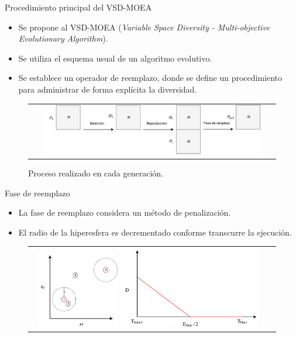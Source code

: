\documentclass{beamer}
\begin{document}
\begin{frame}{Procedimiento principal del VSD-MOEA}
\begin{itemize}
\justifying
\item Se propone al VSD-MOEA (\textit{Variable Space Diversity - Multi-objective Evolutionary Algorithm}).
\justifying
\item Se utiliza el esquema usual de un algoritmo evolutivo.
\justifying
\item Se establece un operador de reemplazo, donde se define un procedimiento para administrar de forma explícita la diversidad.
\end{itemize}
\begin{figure}
\centering
\begin{tabular}{c}
\includegraphics[width=0.9\textwidth]{Evolution_Process.pdf}
\end{tabular}
\caption{Proceso realizado en cada generación.}
\label{fig:DiversityProposal}
\end{figure}
\end{frame}


\begin{frame}{Fase de reemplazo}
\begin{itemize}
\justifying
\item La fase de reemplazo considera un método de penalización.
\justifying
\item El radio de la hiperesfera es decrementado conforme transcurre la ejecución.
\end{itemize}
\begin{figure}
\centering
\begin{tabular}{cc}
\includegraphics[width=0.35\textwidth]{Metodo_Penalizacion.pdf} \quad \quad \quad
\includegraphics[width=0.6\textwidth]{Modelo.pdf}
\end{tabular}
\label{fig:DiversityProposal}
\end{figure}
\end{frame}
\end{document}
